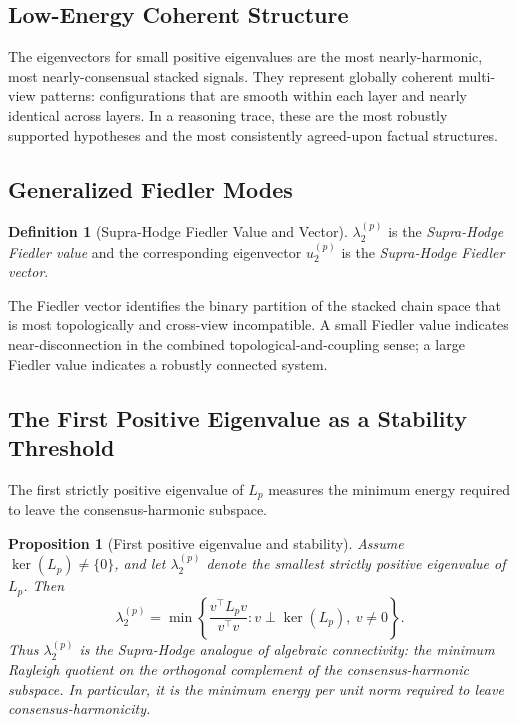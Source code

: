 \documentclass[11pt]{article}
\newtheorem{proposition}[theorem]{Proposition}
\theoremstyle{definition}
\newtheorem{definition}[theorem]{Definition}
\theoremstyle{remark}
\begin{document}
\subsection{Low-Energy Coherent Structure}

The eigenvectors for small positive eigenvalues are the most nearly-harmonic,
most nearly-consensual stacked signals. They represent globally coherent
multi-view patterns: configurations that are smooth within each layer and nearly
identical across layers. In a reasoning trace, these are the most robustly
supported hypotheses and the most consistently agreed-upon factual structures.

\subsection{Generalized Fiedler Modes}

\begin{definition}[Supra-Hodge Fiedler Value and Vector]
$\lambda_2^{(p)}$ is the \emph{Supra-Hodge Fiedler value} and the
corresponding eigenvector $u_2^{(p)}$ is the \emph{Supra-Hodge Fiedler vector}.
\end{definition}

The Fiedler vector identifies the binary partition of the stacked chain space
that is most topologically and cross-view incompatible. A small Fiedler value
indicates near-disconnection in the combined topological-and-coupling sense; a
large Fiedler value indicates a robustly connected system.

\subsection{The First Positive Eigenvalue as a Stability Threshold}

The first strictly positive eigenvalue of $L_p$ measures the minimum energy required to leave the consensus-harmonic subspace.

\begin{proposition}[First positive eigenvalue and stability]
Assume $\ker(L_p)\neq \{0\}$, and let $\lambda_2^{(p)}$ denote the smallest strictly positive eigenvalue of $L_p$. Then
\[
\lambda_2^{(p)}
=
\min \left\{
\frac{v^\top L_p v}{v^\top v}
:
v \perp \ker(L_p),\ v\neq 0
\right\}.
\]
Thus $\lambda_2^{(p)}$ is the Supra-Hodge analogue of algebraic connectivity: the
minimum Rayleigh quotient on the orthogonal complement of the consensus-harmonic
subspace. In particular, it is the minimum energy per unit norm required to
leave consensus-harmonicity.
\end{proposition}
\end{document}
